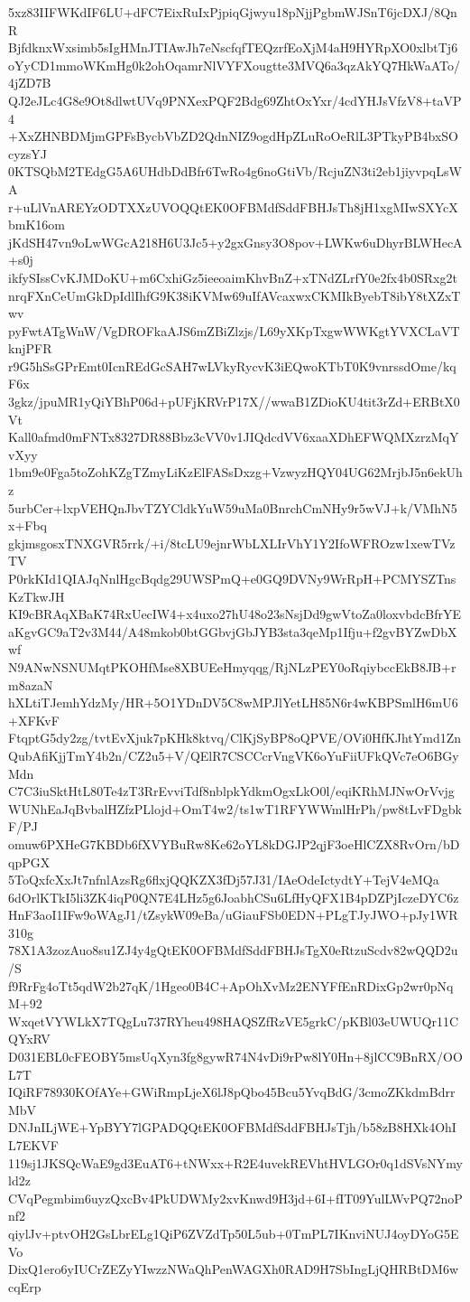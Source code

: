 5xz83IIFWKdIF6LU+dFC7EixRuIxPjpiqGjwyu18pNjjPgbmWJSnT6jcDXJ/8QnR
BjfdknxWxsimb5sIgHMnJTIAwJh7eNscfqfTEQzrfEoXjM4aH9HYRpXO0xlbtTj6
oYyCD1mmoWKmHg0k2ohOqamrNlVYFXougtte3MVQ6a3qzAkYQ7HkWaATo/4jZD7B
QJ2eJLc4G8e9Ot8dlwtUVq9PNXexPQF2Bdg69ZhtOxYxr/4cdYHJsVfzV8+taVP4
+XxZHNBDMjmGPFsBycbVbZD2QdnNIZ9ogdHpZLuRoOeRlL3PTkyPB4bxSOcyzsYJ
0KTSQbM2TEdgG5A6UHdbDdBfr6TwRo4g6noGtiVb/RcjuZN3ti2eb1jiyvpqLsWA
r+uLlVnAREYzODTXXzUVOQQtEK0OFBMdfSddFBHJsTh8jH1xgMIwSXYcXbmK16om
jKdSH47vn9oLwWGcA218H6U3Jc5+y2gxGnsy3O8pov+LWKw6uDhyrBLWHecA+s0j
ikfySIssCvKJMDoKU+m6CxhiGz5ieeoaimKhvBnZ+xTNdZLrfY0e2fx4b0SRxg2t
nrqFXnCeUmGkDpIdlIhfG9K38iKVMw69uIfAVcaxwxCKMIkByebT8ibY8tXZxTwv
pyFwtATgWnW/VgDROFkaAJS6mZBiZlzjs/L69yXKpTxgwWWKgtYVXCLaVTknjPFR
r9G5hSsGPrEmt0IcnREdGcSAH7wLVkyRycvK3iEQwoKTbT0K9vnrssdOme/kqF6x
3gkz/jpuMR1yQiYBhP06d+pUFjKRVrP17X//wwaB1ZDioKU4tit3rZd+ERBtX0Vt
Kall0afmd0mFNTx8327DR88Bbz3cVV0v1JIQdcdVV6xaaXDhEFWQMXzrzMqYvXyy
1bm9e0Fga5toZohKZgTZmyLiKzElFASsDxzg+VzwyzHQY04UG62MrjbJ5n6ekUhz
5urbCer+lxpVEHQnJbvTZYCldkYuW59uMa0BnrchCmNHy9r5wVJ+k/VMhN5x+Fbq
gkjmsgosxTNXGVR5rrk/+i/8tcLU9ejnrWbLXLIrVhY1Y2IfoWFROzw1xewTVzTV
P0rkKId1QIAJqNnlHgcBqdg29UWSPmQ+e0GQ9DVNy9WrRpH+PCMYSZTnsKzTkwJH
KI9cBRAqXBaK74RxUecIW4+x4uxo27hU48o23sNsjDd9gwVtoZa0loxvbdcBfrYE
aKgvGC9aT2v3M44/A48mkob0btGGbvjGbJYB3sta3qeMp1Ifju+f2gvBYZwDbXwf
N9ANwNSNUMqtPKOHfMse8XBUEeHmyqqg/RjNLzPEY0oRqiybccEkB8JB+rm8azaN
hXLtiTJemhYdzMy/HR+5O1YDnDV5C8wMPJlYetLH85N6r4wKBPSmlH6mU6+XFKvF
FtqptG5dy2zg/tvtEvXjuk7pKHk8ktvq/ClKjSyBP8oQPVE/OVi0HfKJhtYmd1Zn
QubAfiKjjTmY4b2n/CZ2u5+V/QElR7CSCCcrVngVK6oYuFiiUFkQVc7eO6BGyMdn
C7C3iuSktHtL80Te4zT3RrEvviTdf8nblpkYdkmOgxLkO0l/eqiKRhMJNwOrVvjg
WUNhEaJqBvbalHZfzPLlojd+OmT4w2/ts1wT1RFYWWmlHrPh/pw8tLvFDgbkF/PJ
omuw6PXHeG7KBDb6fXVYBuRw8Ke62oYL8kDGJP2qjF3oeHlCZX8RvOrn/bDqpPGX
5ToQxfcXxJt7nfnlAzsRg6flxjQQKZX3fDj57J31/IAeOdeIctydtY+TejV4eMQa
6dOrlKTkI5li3ZK4iqP0QN7E4LHz5g6JoabhCSu6LfHyQFX1B4pDZPjIczeDYC6z
HnF3aoI1IFw9oWAgJ1/tZsykW09eBa/uGiauFSb0EDN+PLgTJyJWO+pJy1WR310g
78X1A3zozAuo8su1ZJ4y4gQtEK0OFBMdfSddFBHJsTgX0eRtzuScdv82wQQD2u/S
f9RrFg4oTt5qdW2b27qK/1Hgeo0B4C+ApOhXvMz2ENYFfEnRDixGp2wr0pNqM+92
WxqetVYWLkX7TQgLu737RYheu498HAQSZfRzVE5grkC/pKBl03eUWUQr11CQYxRV
D031EBL0cFEOBY5msUqXyn3fg8gywR74N4vDi9rPw8lY0Hn+8jlCC9BnRX/OOL7T
IQiRF78930KOfAYe+GWiRmpLjeX6lJ8pQbo45Bcu5YvqBdG/3cmoZKkdmBdrrMbV
DNJnILjWE+YpBYY7lGPADQQtEK0OFBMdfSddFBHJsTjh/b58zB8HXk4OhIL7EKVF
119sj1JKSQcWaE9gd3EuAT6+tNWxx+R2E4uvekREVhtHVLGOr0q1dSVsNYmyld2z
CVqPegmbim6uyzQxcBv4PkUDWMy2xvKnwd9H3jd+6I+fIT09YulLWvPQ72noPnf2
qiylJv+ptvOH2GsLbrELg1QiP6ZVZdTp50L5ub+0TmPL7IKnviNUJ4oyDYoG5EVo
DixQ1ero6yIUCrZEZyYIwzzNWaQhPenWAGXh0RAD9H7SbIngLjQHRBtDM6wcqErp
